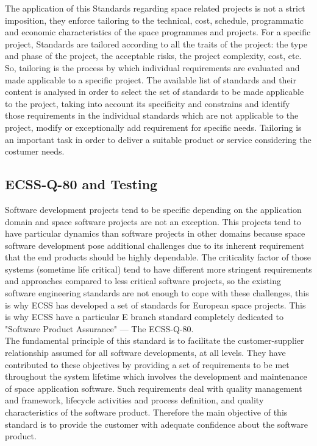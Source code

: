 {The application of this Standards regarding space related projects is not a strict imposition, they enforce
tailoring to the technical, cost, schedule, programmatic and economic characteristics of the space programmes and projects.
For a specific project, Standards are tailored according to all the traits of the project: the type and 
phase of the project, the acceptable risks, the project complexity, cost, etc.
So, tailoring is the process by which individual requirements are evaluated and made applicable to a specific project.
The available list of standards and their content is analysed in order to select the set of standards to be made applicable to the project, taking 
into account its specificity and constrains and identify those requirements in the individual standards which are not 
applicable to the project, modify or exceptionally add requirement for specific needs\cite{ecss-s-st-00c}.
Tailoring is an important task in order to deliver a suitable product or service considering the costumer needs.

\subsection{ECSS-Q-80 and Testing}
Software development projects tend to be specific depending on the application domain and 
space software projects are not an exception. This projects tend to have particular dynamics than software projects
in other domains because space software development pose additional challenges due to its inherent
requirement that the end products should be highly dependable.
The criticality factor of those systems (sometime life critical) tend to have different more stringent requirements and approaches 
compared to less critical software projects, so
the existing software engineering standards are not enough to cope with these challenges, this is why \ac{ECSS} has developed a set of standards for European
space projects\cite{Ahmad2010AgileECSS,10.1109/SESS.1997.595952}.
This is why \ac{ECSS} have a particular E branch standard completely dedicated to "Software Product Assurance" --- The ECSS-Q-80\cite{ecss-q-st-80c}.\\

The fundamental principle of this standard is to facilitate the
customer-supplier relationship assumed for all software developments, at all levels.
They have contributed to these objectives by providing a set of requirements to be
met throughout the system lifetime which involves the development and
maintenance of space application software. Such requirements deal with quality
management and framework, lifecycle activities and process definition, and quality
characteristics of the software product\cite{Mattiello-FranciscoSanAmbJogCos:2007:BrSoIn}.
Therefore the main objective of this standard is to provide the customer with adequate confidence about the software product.\\

}
